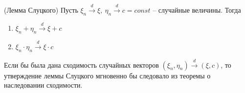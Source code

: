 \begin{theorem} (Лемма Слуцкого)
    Пусть $\xi_n \xrightarrow{d} \xi,\ \eta_n \xrightarrow{d} c = const$ -- случайные величины. Тогда
    \begin{enumerate}
        \item $\xi_n + \eta_n \xrightarrow{d} \xi + c$
        \item $\xi_n \cdot \eta_n \xrightarrow{d} \xi \cdot c$
    \end{enumerate}
\end{theorem}

\begin{note}
    Если бы была дана сходимость случайных векторов $(\xi_n, \eta_n) \xrightarrow{d} (\xi, c)$, то утверждение леммы Слуцкого мгновенно бы следовало из теоремы о наследовании сходимости.
\end{note}

